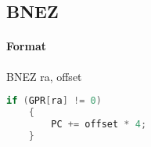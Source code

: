 \subsection{BNEZ}


\paragraph{Format} BNEZ ra, offset

\begin{lstlisting}[language=c]
    if (GPR[ra] != 0)
    {
        PC += offset * 4;
    }
\end{lstlisting}

